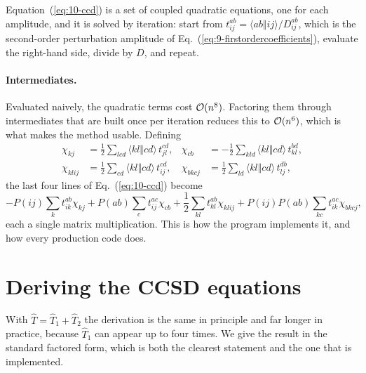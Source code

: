 Equation~(\ref{eq:10-ccd}) is a set of coupled quadratic equations, one for
each amplitude, and it is solved by iteration: start from
$t_{ij}^{ab}=\langle ab\Vert ij\rangle/D_{ij}^{ab}$, which is the second-order
perturbation amplitude of Eq.~(\ref{eq:9-firstordercoefficients}), evaluate
the right-hand side, divide by $D$, and repeat.

\paragraph{Intermediates.}
Evaluated naively, the quadratic terms cost $\mathcal{O}(n^8)$.  Factoring them
through intermediates that are built once per iteration reduces this to
$\mathcal{O}(n^6)$, which is what makes the method usable.  Defining
\begin{align}
  \chi_{kj} &= \frac{1}{2}\sum_{lcd}
    \langle kl\Vert cd\rangle\,t_{jl}^{cd},
  &
  \chi_{cb} &= -\frac{1}{2}\sum_{kld}
    \langle kl\Vert cd\rangle\,t_{kl}^{bd},
  \nonumber\\
  \chi_{klij} &= \frac{1}{2}\sum_{cd}
    \langle kl\Vert cd\rangle\,t_{ij}^{cd},
  &
  \chi_{bkcj} &= \frac{1}{2}\sum_{ld}
    \langle kl\Vert cd\rangle\,t_{lj}^{db},
  \label{eq:10-intermediates}
\end{align}
the last four lines of Eq.~(\ref{eq:10-ccd}) become
\begin{equation}
  -P(ij)\sum_k t_{ik}^{ab}\chi_{kj}
  + P(ab)\sum_c t_{ij}^{ac}\chi_{cb}
  + \frac{1}{2}\sum_{kl}t_{kl}^{ab}\chi_{klij}
  + P(ij)P(ab)\sum_{kc}t_{ik}^{ac}\chi_{bkcj},
  \label{eq:10-intermediateform}
\end{equation}
each a single matrix multiplication.  This is how the program implements it,
and how every production code does.

\section{Deriving the CCSD equations}
\label{sec:ccsdderivation}

With $\hat{T}=\hat{T}_1+\hat{T}_2$ the derivation is the same in principle and
far longer in practice, because $\hat{T}_1$ can appear up to four times.  We
give the result in the standard factored form, which is both the clearest
statement and the one that is implemented.

